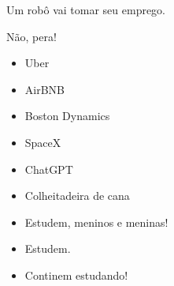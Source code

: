{\Large Um robô vai tomar seu emprego.
		
	\LARGE Não, pera!
}

\begin{itemize}
	\item Uber
	\item AirBNB
	\item Boston Dynamics
	\item SpaceX
	\item ChatGPT
	\item Colheitadeira de cana
	\item Estudem, meninos e meninas!
	\item Estudem.
	\item Continem estudando!
\end{itemize}


\vfill\null
\columnbreak